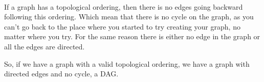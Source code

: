 \paragraph{}

If a graph has a topological ordering, then there is no edges going backward following this ordering.
Which mean that there is no cycle on the graph, as you can't go back to the place where you started to try creating your
graph, no matter where you try.
For the same reason there is either no edge in the graph or all the edges are directed.

So, if we have a graph with a valid topological ordering, we have a graph with directed edges and no cycle, a DAG.


